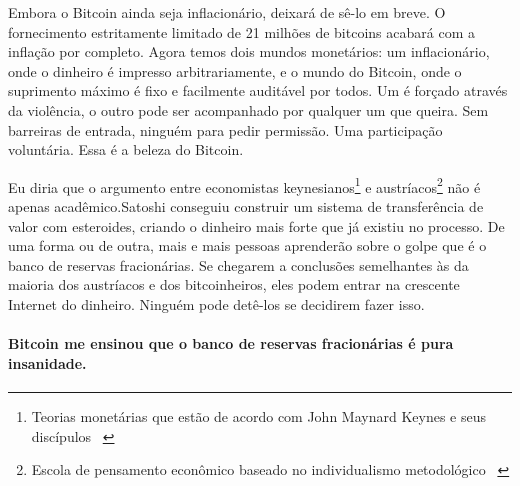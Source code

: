 Embora o Bitcoin ainda seja inflacionário, deixará de sê-lo em breve. O fornecimento estritamente limitado de 21 milhões de bitcoins acabará com a inflação por completo. Agora temos dois mundos monetários: um inflacionário, onde o dinheiro é impresso arbitrariamente, e o mundo do Bitcoin, onde o suprimento máximo é fixo e facilmente auditável por todos. Um é forçado através da violência, o outro pode ser acompanhado por qualquer um que queira. Sem barreiras de entrada, ninguém para pedir permissão. Uma participação voluntária. Essa é a beleza do Bitcoin.

\newpage

Eu diria que o argumento entre economistas keynesianos\footnote{Teorias monetárias que estão de acordo com John Maynard Keynes e seus discípulos ~\cite{wiki:keynesian}} e austríacos\footnote{Escola de pensamento econômico baseado no individualismo metodológico ~\cite{wiki:austrian}} não é apenas acadêmico.Satoshi conseguiu construir um sistema de transferência de valor com esteroides, criando o dinheiro mais forte que já existiu no processo. De uma forma ou de outra, mais e mais pessoas aprenderão sobre o golpe que é o banco de reservas fracionárias. Se chegarem a conclusões semelhantes às da maioria dos austríacos e dos bitcoinheiros, eles podem entrar na crescente Internet do dinheiro. Ninguém pode detê-los se decidirem fazer isso.

\paragraph{Bitcoin me ensinou que o banco de reservas fracionárias é pura insanidade.}

%
%
%
%
%
